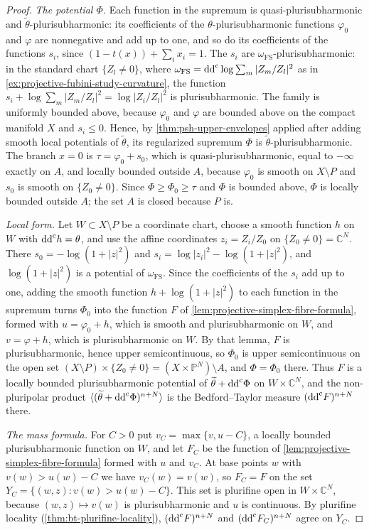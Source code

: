 \begin{proof}
\emph{The potential $\Phi$.} Each function in the supremum is quasi-plurisubharmonic and $\widetilde\theta$-plurisubharmonic: its coefficients of the $\theta$-plurisubharmonic functions $\varphi_0$ and $\varphi$ are nonnegative and add up to one, and so do its coefficients of the functions $s_i$, since $(1-t(x))+\sum_ix_i=1$. The $s_i$ are $\omega_{\mathrm{FS}}$-plurisubharmonic: in the standard chart $\{Z_l\neq0\}$, where $\omega_{\mathrm{FS}}=\mathrm{dd}^{\mathrm{c}}\log\sum_m|Z_m/Z_l|^2$ as in \cref{ex:projective-fubini-study-curvature}, the function $s_i+\log\sum_m|Z_m/Z_l|^2=\log|Z_i/Z_l|^2$ is plurisubharmonic. The family is uniformly bounded above, because $\varphi_0$ and $\varphi$ are bounded above on the compact manifold $X$ and $s_i\leq0$. Hence, by \cref{thm:psh-upper-envelopes} applied after adding smooth local potentials of $\widetilde\theta$, its regularized supremum $\Phi$ is $\widetilde\theta$-plurisubharmonic. The branch $x=0$ is $\tau=\varphi_0+s_0$, which is quasi-plurisubharmonic, equal to $-\infty$ exactly on $A$, and locally bounded outside $A$, because $\varphi_0$ is smooth on $X\setminus P$ and $s_0$ is smooth on $\{Z_0\neq0\}$. Since $\Phi\geq\Phi_0\geq\tau$ and $\Phi$ is bounded above, $\Phi$ is locally bounded outside $A$; the set $A$ is closed because $P$ is.

\emph{Local form.} Let $W\subset X\setminus P$ be a coordinate chart, choose a smooth function $h$ on $W$ with $\mathrm{dd}^{\mathrm{c}} h=\theta$, and use the affine coordinates $z_i=Z_i/Z_0$ on $\{Z_0\neq0\}=\mathbb C^N$. There $s_0=-\log(1+|z|^2)$ and $s_i=\log|z_i|^2-\log(1+|z|^2)$, and $\log(1+|z|^2)$ is a potential of $\omega_{\mathrm{FS}}$. Since the coefficients of the $s_i$ add up to one, adding the smooth function $h+\log(1+|z|^2)$ to each function in the supremum turns $\Phi_0$ into the function $F$ of \cref{lem:projective-simplex-fibre-formula}, formed with $u=\varphi_0+h$, which is smooth and plurisubharmonic on $W$, and $v=\varphi+h$, which is plurisubharmonic on $W$. By that lemma, $F$ is plurisubharmonic, hence upper semicontinuous, so $\Phi_0$ is upper semicontinuous on the open set $(X\setminus P)\times\{Z_0\neq0\}=(X\times\mathbb P^N)\setminus A$, and $\Phi=\Phi_0$ there. Thus $F$ is a locally bounded plurisubharmonic potential of $\widetilde\theta+\mathrm{dd}^{\mathrm{c}}\Phi$ on $W\times\mathbb C^N$, and the non-pluripolar product $\langle(\widetilde\theta+\mathrm{dd}^{\mathrm{c}}\Phi)^{n+N}\rangle$ is the Bedford--Taylor measure $(\mathrm{dd}^{\mathrm{c}} F)^{n+N}$ there.

\emph{The mass formula.} For $C>0$ put $v_C=\max\{v,u-C\}$, a locally bounded plurisubharmonic function on $W$, and let $F_C$ be the function of \cref{lem:projective-simplex-fibre-formula} formed with $u$ and $v_C$. At base points $w$ with $v(w)>u(w)-C$ we have $v_C(w)=v(w)$, so $F_C=F$ on the set $Y_C=\{(w,z):v(w)>u(w)-C\}$. This set is plurifine open in $W\times\mathbb C^N$, because $(w,z)\mapsto v(w)$ is plurisubharmonic and $u$ is continuous. By plurifine locality (\cref{thm:bt-plurifine-locality}), $(\mathrm{dd}^{\mathrm{c}} F)^{n+N}$ and $(\mathrm{dd}^{\mathrm{c}} F_C)^{n+N}$ agree on $Y_C$.


\end{proof}
